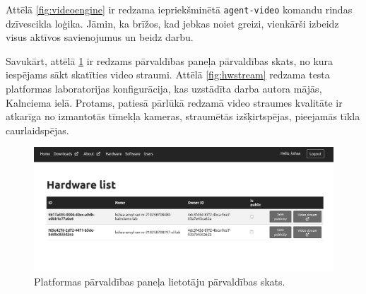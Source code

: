 Attēlā \ref{fig:videoengine} ir redzama iepriekšminētā \lstinline!agent-video!
komandu rindas  dzīvescikla loģika. Jāmin, ka brīžos,
kad jebkas noiet greizi,  vienkārši izbeidz visus
aktīvos savienojumus un beidz darbu.

Savukārt, attēlā \ref{fig:mgmtpanelhw} ir redzams pārvaldības paneļa
 pārvaldības skats, no kura iespējams sākt skatīties
 video straumi. Attēlā \ref{fig:hwstream} redzama
testa platformas laboratorijas konfigurācija, kas uzstādīta darba autora mājās,
Kalnciema ielā. \cite{VeinbahsKrisjanisProduction} Protams, patiesā pārlūkā
redzamā video straumes kvalitāte ir atkarīga no izmantotās tīmekļa kameras,
straumētās izšķirtspējas, pieejamās tīkla caurlaidspējas. 

\begin{figure}[H]
    \includegraphics[width=0.9\linewidth]{assets/mgmt-panel-hw-gray.png}
    \centering
    \caption{Platformas pārvaldības paneļa lietotāju pārvaldības skats.}
    \label{fig:mgmtpanelhw}
\end{figure}


